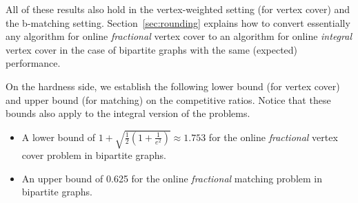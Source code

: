 \documentclass{article}
\begin{document}
All of these results also hold in the vertex-weighted setting (for vertex cover) and the b-matching setting.
Section~\ref{sec:rounding} explains how to convert essentially any algorithm for online {\em fractional} vertex cover to an algorithm for online {\em integral} vertex cover in the case of bipartite graphs with the same (expected) performance. 



On the hardness side, we establish the following lower bound (for vertex cover) and upper bound (for matching) on the competitive ratios. Notice that these bounds also apply to the integral version of the problems.
\begin{itemize}
\item A lower bound of $1+\sqrt{\frac{1}{2}\left(1+\frac{1}{e^2}\right)}\approx 1.753$ for the  online {\em fractional} vertex cover problem in bipartite graphs.
\item An upper bound of 0.625 for the online {\em fractional} matching problem in bipartite graphs. 
\end{itemize}
\end{document}
